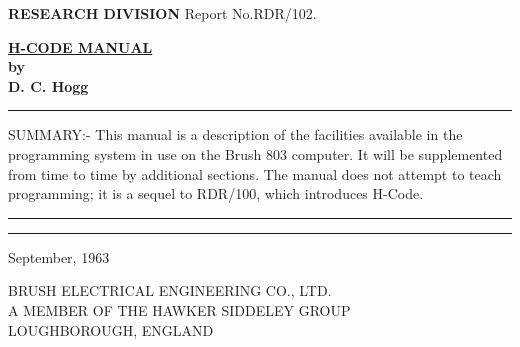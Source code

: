 \documentclass[10pt, a4paper, oneside]{article}
\newcommand{\myuline}[1]{\uline{#1}}
\begin{document}
\begin{flushleft}
\textbf{\Huge {} \Large RESEARCH DIVISION} \hfill \normalsize Report No.RDR/102.
\end{flushleft}

\vspace{3cm}

\begin{center}
\myuline{\textbf{H-CODE MANUAL}} \\
\textbf{by} \\
\textbf{D. C. Hogg} \\
\end{center}

\vspace{3cm}

\par\noindent\rule{\textwidth}{0.4pt}\relax

\vspace{3cm}

\begin{center}
\parbox{0.55\textwidth}{%
SUMMARY:- This manual is a description of the facilities
available in the programming system in use on the Brush 803
computer.  It will be supplemented from time to time by additional
sections.  The manual does not attempt to teach programming; it
is a sequel to RDR/100, which introduces H-Code.}
\end{center}

\vspace{3cm}
\par\noindent\rule{\textwidth}{0.4pt}\relax\vspace{1mm}
\noindent\rule{\textwidth}{0.4pt}\relax

\vspace{1cm}

\begin{center}
September, 1963
\end{center}

\vfill

\begin{center}
\large BRUSH ELECTRICAL ENGINEERING CO., LTD. \\
\small A MEMBER OF THE HAWKER SIDDELEY GROUP \\
\large LOUGHBOROUGH, ENGLAND \\
\end{center}


\newpage
\end{document}
